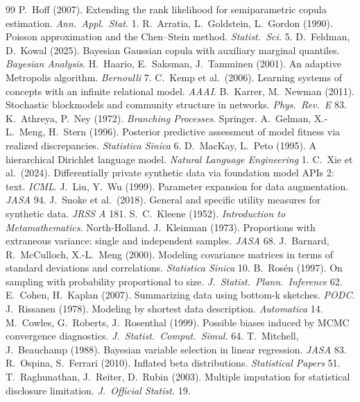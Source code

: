 \documentclass[11pt,a4paper]{article}
\theoremstyle{definition}
\theoremstyle{remark}
\begin{document}
\begin{thebibliography}{99}
 P.~Hoff (2007). Extending the rank likelihood for semiparametric copula estimation. \emph{Ann.\ Appl.\ Stat.} 1.
 R.~Arratia, L.~Goldstein, L.~Gordon (1990). Poisson approximation and the Chen--Stein method. \emph{Statist.\ Sci.} 5.
 D.~Feldman, D.~Kowal (2025). Bayesian Gaussian copula with auxiliary marginal quantiles. \emph{Bayesian Analysis}.
 H.~Haario, E.~Saksman, J.~Tamminen (2001). An adaptive Metropolis algorithm. \emph{Bernoulli} 7.
 C.~Kemp et al.\ (2006). Learning systems of concepts with an infinite relational model. \emph{AAAI}.
 B.~Karrer, M.~Newman (2011). Stochastic blockmodels and community structure in networks. \emph{Phys.\ Rev.\ E} 83.
 K.~Athreya, P.~Ney (1972). \emph{Branching Processes}. Springer.
 A.~Gelman, X.-L.~Meng, H.~Stern (1996). Posterior predictive assessment of model fitness via realized discrepancies. \emph{Statistica Sinica} 6.
 D.~MacKay, L.~Peto (1995). A hierarchical Dirichlet language model. \emph{Natural Language Engineering} 1.
 C.~Xie et al.\ (2024). Differentially private synthetic data via foundation model APIs 2: text. \emph{ICML}.
 J.~Liu, Y.~Wu (1999). Parameter expansion for data augmentation. \emph{JASA} 94.
 J.~Snoke et al.\ (2018). General and specific utility measures for synthetic data. \emph{JRSS A} 181.
 S.~C.~Kleene (1952). \emph{Introduction to Metamathematics}. North-Holland.
 J.~Kleinman (1973). Proportions with extraneous variance: single and independent samples. \emph{JASA} 68.
 J.~Barnard, R.~McCulloch, X.-L.~Meng (2000). Modeling covariance matrices in terms of standard deviations and correlations. \emph{Statistica Sinica} 10.
 B.~Ros\'en (1997). On sampling with probability proportional to size. \emph{J.\ Statist.\ Plann.\ Inference} 62.
 E.~Cohen, H.~Kaplan (2007). Summarizing data using bottom-k sketches. \emph{PODC}.
 J.~Rissanen (1978). Modeling by shortest data description. \emph{Automatica} 14.
 M.~Cowles, G.~Roberts, J.~Rosenthal (1999). Possible biases induced by MCMC convergence diagnostics. \emph{J.\ Statist.\ Comput.\ Simul.} 64.
 T.~Mitchell, J.~Beauchamp (1988). Bayesian variable selection in linear regression. \emph{JASA} 83.
 R.~Ospina, S.~Ferrari (2010). Inflated beta distributions. \emph{Statistical Papers} 51.
 T.~Raghunathan, J.~Reiter, D.~Rubin (2003). Multiple imputation for statistical disclosure limitation. \emph{J.\ Official Statist.} 19.

\end{thebibliography}
\end{document}
